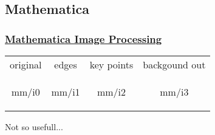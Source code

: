 \subsection{Mathematica}
\begin{frame}\frametitle{\href{https://reference.wolfram.com/language/guide/ImageProcessing.html}{Mathematica Image Processing}}
\center
\begin{table}[htp]
\begin{center}
\begin{tabular}{cccc}
	original & edges & key points & backgound out \\
	\begin{overpic}[ scale = 0.75]
		{\pLocalGraphics mm/i0}
	\end{overpic} &
	\begin{overpic}[ scale = 0.75]
		{\pLocalGraphics mm/i1}
	\end{overpic} &
	\begin{overpic}[ scale = 0.75]
		{\pLocalGraphics mm/i2}
	\end{overpic} &
	\begin{overpic}[ scale = 0.75]
		{\pLocalGraphics mm/i3}
	\end{overpic}
\end{tabular}
\end{center}
\label{tab:mm}
\end{table}%
Not so usefull...
\end{frame}



